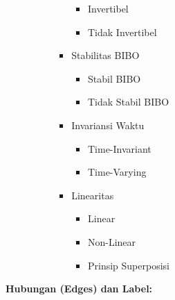 \documentclass[
  letterpaper,
  DIV=11,
  numbers=noendperiod]{scrreprt}
\providecommand{\tightlist}{%
  \setlength{\itemsep}{0pt}\setlength{\parskip}{0pt}}
\begin{document}
\begin{itemize}
\begin{itemize}
\begin{itemize}
\begin{itemize}
        \begin{itemize}
        \tightlist
        \item
          Invertibel
        \item
          Tidak Invertibel
        \end{itemize}
      \item
        Stabilitas BIBO

        \begin{itemize}
        \tightlist
        \item
          Stabil BIBO
        \item
          Tidak Stabil BIBO
        \end{itemize}
      \item
        Invariansi Waktu

        \begin{itemize}
        \tightlist
        \item
          Time-Invariant
        \item
          Time-Varying
        \end{itemize}
      \item
        Linearitas

        \begin{itemize}
        \tightlist
        \item
          Linear
        \item
          Non-Linear
        \item
          Prinsip Superposisi
        \end{itemize}
      \end{itemize}
    \end{itemize}
  \end{itemize}
\end{itemize}

\textbf{Hubungan (Edges) dan Label:}
\end{document}
